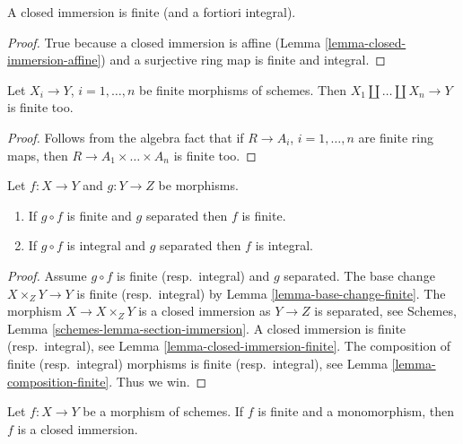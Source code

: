 \begin{lemma}
\label{lemma-closed-immersion-finite}
A closed immersion is finite (and a fortiori integral).
\end{lemma}

\begin{proof}
True because a closed immersion is affine
(Lemma \ref{lemma-closed-immersion-affine})
and a surjective ring map is finite and integral.
\end{proof}

\begin{lemma}
\label{lemma-finite-union-finite}
Let $X_i \to Y$, $i = 1, \ldots, n$ be finite morphisms of schemes.
Then $X_1 \amalg \ldots \amalg X_n \to Y$ is finite too.
\end{lemma}

\begin{proof}
Follows from the algebra fact that if $R \to A_i$, $i = 1, \ldots, n$
are finite ring maps, then $R \to A_1 \times \ldots \times A_n$ is finite too.
\end{proof}

\begin{lemma}
\label{lemma-finite-permanence}
Let $f : X \to Y$ and $g : Y \to Z$ be morphisms.
\begin{enumerate}
\item If $g \circ f$ is finite and $g$ separated then $f$ is finite.
\item If $g \circ f$ is integral and $g$ separated then $f$ is integral.
\end{enumerate}
\end{lemma}

\begin{proof}
Assume $g \circ f$ is finite (resp.\ integral) and $g$ separated.
The base change $X \times_Z Y \to Y$ is finite (resp.\ integral) by
Lemma \ref{lemma-base-change-finite}.
The morphism $X \to X \times_Z Y$ is
a closed immersion as $Y \to Z$ is separated, see
Schemes, Lemma \ref{schemes-lemma-section-immersion}.
A closed immersion is finite (resp.\ integral),
see Lemma \ref{lemma-closed-immersion-finite}.
The composition of finite (resp.\ integral) morphisms is finite
(resp.\ integral),
see Lemma \ref{lemma-composition-finite}. Thus we win.
\end{proof}

\begin{lemma}
\label{lemma-finite-monomorphism-closed}
Let $f : X \to Y$ be a morphism of schemes.
If $f$ is finite and a monomorphism, then $f$ is a closed immersion.
\end{lemma}

